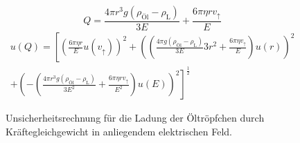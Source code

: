 \begin{figure}[h]
	\begin{equation*}
		Q = \frac{4\pi r^3g(\rho_\text{Öl}-\rho_\text{L})}{3E}+ \frac{6\pi \eta r v_\uparrow}{E}
	\end{equation*}
	\begin{align*}
		u(Q) = \left[ \left( \frac{6\pi \eta r}{E} u(v_\uparrow) \right)^2  + \left( \left( \frac{4\pi g (\rho_\text{Öl} - \rho_\text{L})}{3E} 3 r^2 + \frac{6\pi \eta v_\uparrow}{E} \right) u(r) \right)^2 \right.\\ + \left.\left( - \left( \frac{4\pi r^3 g (\rho_\text{Öl} - \rho_\text{L})} {3E^2} + \frac{6\pi \eta r v_\uparrow}{E^2} \right) u(E) \right)^2  \right]^\frac{1}{2}
	\end{align*}
	\caption{Unsicherheitsrechnung für die Ladung der Öltröpfchen durch Kräftegleichgewicht in anliegendem elektrischen Feld.}
	\label{eq:unc_Q}
\end{figure}